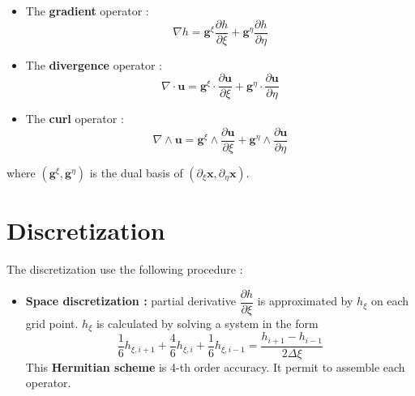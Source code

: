 \documentclass{sciposter}
\begin{document}
\begin{multicols}{3}
\begin{itemize}
\item The \textbf{gradient} operator :
\begin{equation}
\nabla h = \mathbf{g}^{\xi} \dfrac{\partial h}{\partial \xi} + \mathbf{g}^{\eta} \dfrac{\partial h}{\partial \eta}
\end{equation}
\item The \textbf{divergence} operator :
\begin{equation}
\nabla \cdot \mathbf{u} = \mathbf{g}^{\xi} \cdot \dfrac{\partial \mathbf{u}}{\partial \xi} + \mathbf{g}^{\eta} \cdot \dfrac{\partial \mathbf{u}}{\partial \eta}
\end{equation}
\item The \textbf{curl} operator :
\begin{equation}
\nabla \wedge \mathbf{u} = \mathbf{g}^{\xi} \wedge \dfrac{\partial \mathbf{u}}{\partial \xi} + \mathbf{g}^{\eta} \wedge \dfrac{\partial \mathbf{u}}{\partial \eta}
\end{equation}
\end{itemize}

where $(\mathbf{g}^{\xi}, \mathbf{g}^{\eta})$ is the dual basis of $(\partial_{\xi} \mathbf{x},\partial_{\eta} \mathbf{x})$.

\section{Discretization}
The discretization use the following procedure \cite{C2015} :
\begin{itemize}
\item \textbf{Space discretization :} partial derivative $\dfrac{\partial h}{\partial \xi}$ is approximated by $h_{\xi}$ on each grid point. $h_{\xi}$ is calculated by solving a system in the form 
\begin{equation}
\dfrac{1}{6} h_{\xi,i+1} + \dfrac{4}{6} h_{\xi,i} + \dfrac{1}{6} h_{\xi,i-1} = \dfrac{h_{i+1} - h_{i-1}}{2 \Delta \xi}
\end{equation}
This \textbf{Hermitian scheme} is 4-th order accuracy. It permit to assemble each operator.


\end{itemize}
\end{multicols}
\end{document}
